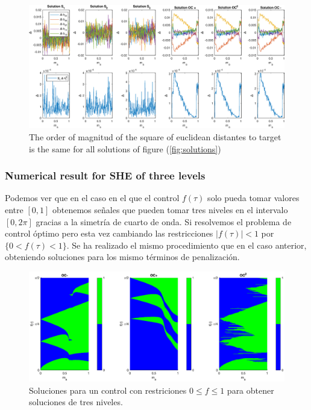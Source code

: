  
\begin{figure}
    \centering
    \includegraphics[scale=0.5]{img/EX01.eps}
    \caption{The order of magnitud of the square of euclidean distantes to target is the same for all solutions of figure (\ref{fig:solutions})}
    \label{fig:error_solutions}
\end{figure}

\subsubsection{Numerical result for SHE of three levels}

Podemos ver que en el caso en el que el control $f(\tau)$ solo pueda tomar valores entre $[0,1]$ obtenemos señales que pueden tomar tres niveles en el intervalo $[0,2\pi]$ gracias a la simetría de cuarto de onda. Si resolvemos el problema de control óptimo pero esta vez cambiando las restricciones $|f(\tau)|<1$ por $\{0<f(\tau)<1\}$. Se ha realizado el mismo procedimiento que en el caso anterior, obteniendo soluciones para los mismo términos de penalización.

\begin{figure}
    \centering
    \includegraphics[scale=0.45]{img/EX01_surf_3LVL.eps}
    \caption{Soluciones para un control  con restriciones $0 \leq f\leq 1$ para obtener soluciones de tres niveles.}
\end{figure}

